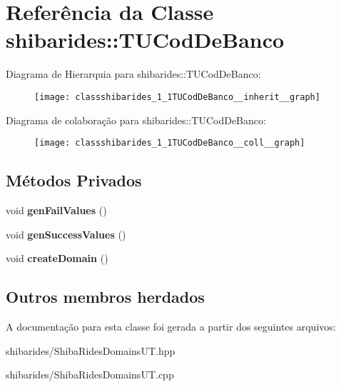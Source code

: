 \hypertarget{classshibarides_1_1TUCodDeBanco}{}\section{Referência da Classe shibarides\+:\+:T\+U\+Cod\+De\+Banco}
\label{classshibarides_1_1TUCodDeBanco}


Diagrama de Hierarquia para shibarides\+:\+:T\+U\+Cod\+De\+Banco\+:\nopagebreak
\begin{figure}[H]
\begin{center}
\leavevmode
\texttt{[image: classshibarides\_1\_1TUCodDeBanco\_\_inherit\_\_graph]}
\end{center}
\end{figure}


Diagrama de colaboração para shibarides\+:\+:T\+U\+Cod\+De\+Banco\+:\nopagebreak
\begin{figure}[H]
\begin{center}
\leavevmode
\texttt{[image: classshibarides\_1\_1TUCodDeBanco\_\_coll\_\_graph]}
\end{center}
\end{figure}
\subsection*{Métodos Privados}
\begin{DoxyCompactItemize}
\item 
void {\bfseries gen\+Fail\+Values} ()\hypertarget{classshibarides_1_1TUCodDeBanco_a1be8519f0fd272ed30c8bf95129c0e73}{}\label{classshibarides_1_1TUCodDeBanco_a1be8519f0fd272ed30c8bf95129c0e73}

\item 
void {\bfseries gen\+Success\+Values} ()\hypertarget{classshibarides_1_1TUCodDeBanco_a5c3d2e95fe26d3a3620c277c0a97579b}{}\label{classshibarides_1_1TUCodDeBanco_a5c3d2e95fe26d3a3620c277c0a97579b}

\item 
void {\bfseries create\+Domain} ()\hypertarget{classshibarides_1_1TUCodDeBanco_a65d74f2fb107cb039c5abe74ebc0b1fc}{}\label{classshibarides_1_1TUCodDeBanco_a65d74f2fb107cb039c5abe74ebc0b1fc}

\end{DoxyCompactItemize}
\subsection*{Outros membros herdados}


A documentação para esta classe foi gerada a partir dos seguintes arquivos\+:\begin{DoxyCompactItemize}
\item 
shibarides/Shiba\+Rides\+Domains\+U\+T.\+hpp\item 
shibarides/Shiba\+Rides\+Domains\+U\+T.\+cpp\end{DoxyCompactItemize}
